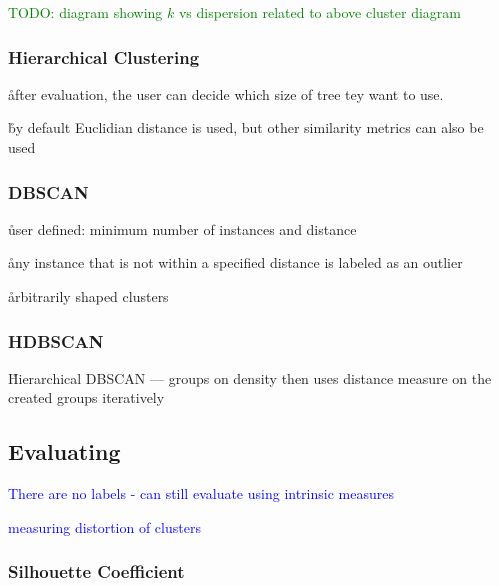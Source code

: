 \textcolor{green}{TODO: diagram showing $k$ vs dispersion related to above cluster diagram}



\subsubsection{Hierarchical Clustering}



\r{after evaluation, the user can decide which size of tree tey want to use.}

\r{by default Euclidian distance is used, but other similarity metrics can also be used }



\subsubsection{DBSCAN}


\r{user defined: minimum number of instances and distance}

\r{any instance that is not within a specified distance is labeled as an outlier}

\r{arbitrarily shaped clusters}

\subsubsection{HDBSCAN}

\r{Hierarchical DBSCAN --- groups on density then uses distance measure on the created groups iteratively}


\subsection{Evaluating}

\textcolor{blue}{There are no labels - can still evaluate using intrinsic measures}

\textcolor{blue}{measuring distortion of clusters}

\subsubsection{Silhouette Coefficient}


